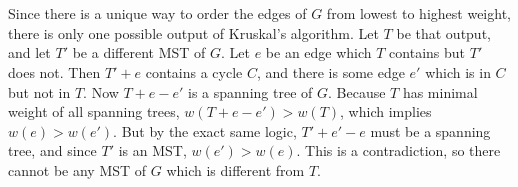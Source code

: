 \documentclass[12pt]{article}
\begin{document}
\section{}
\noindent{}\bigskip\par
Since there is a unique way to order the edges of $G$ from lowest to highest weight, there is only one possible output of Kruskal's algorithm. Let $T$ be that output, and let $T'$ be a different MST of $G$. Let $e$ be an edge which $T$ contains but $T'$ does not. Then $T'+e$ contains a cycle $C$, and there is some edge $e'$ which is in $C$ but not in $T$. Now $T+e-e'$ is a spanning tree of $G$. Because $T$ has minimal weight of all spanning trees, $w(T+e-e')>w(T)$, which implies $w(e)>w(e')$. But by the exact same logic, $T'+e'-e$ must be a spanning tree, and since $T'$ is an MST, $w(e')>w(e)$. This is a contradiction, so there cannot be any MST of $G$ which is different from $T$.
\end{document}

